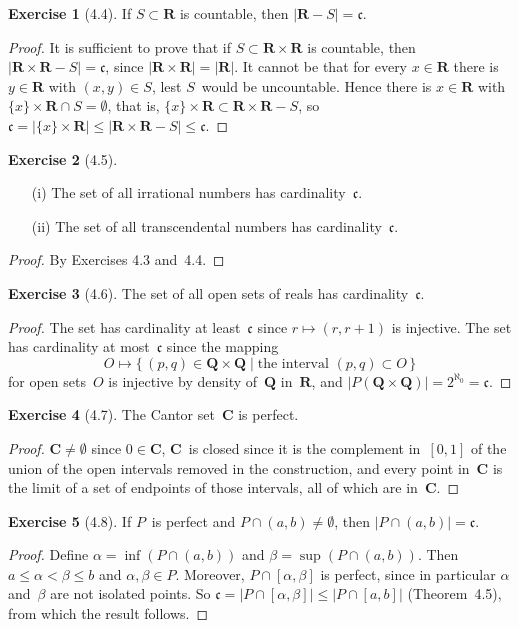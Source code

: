 \documentclass[letterpaper,12pt]{article}
\newcommand{\Q}{\boldsymbol{Q}}
\newcommand{\R}{\boldsymbol{R}}
\newcommand{\C}{\boldsymbol{C}}
\renewcommand{\P}{P}
\newcommand{\cc}{\mathfrak{c}}
\newcommand{\al}{\aleph}
\newcommand{\sect}{\cap}
\newcommand{\card}[1]{|#1|}
\theoremstyle{definition}
\newtheorem*{exer}{Exercise}
\theoremstyle{remark}
\begin{document}
\begin{exer}[4.4]
If \(S\subset\R\) is countable, then \(\card{\R-S}=\cc\).
\end{exer}
\begin{proof}
It is sufficient to prove that if \(S\subset\R\times\R\) is countable, then \(\card{\R\times\R-S}=\cc\), since \(\card{\R\times\R}=\card{\R}\). It cannot be that for every \(x\in\R\) there is \(y\in\R\) with \((x,y)\in S\), lest \(S\)~would be uncountable. Hence there is \(x\in\R\) with \(\{x\}\times\R\sect S=\emptyset\), that is, \(\{x\}\times\R\subset\R\times\R-S\), so \(\cc=\card{\{x\}\times\R}\le\card{\R\times\R-S}\le\cc\).
\end{proof}

\begin{exer}[4.5]\
\begin{enumerate}[itemsep=0pt]
\item[(i)] The set of all irrational numbers has cardinality~\(\cc\).
\item[(ii)] The set of all transcendental numbers has cardinality~\(\cc\).
\end{enumerate}
\end{exer}
\begin{proof}
By Exercises 4.3 and~4.4.
\end{proof}

\begin{exer}[4.6]
The set of all open sets of reals has cardinality~\(\cc\).
\end{exer}
\begin{proof}
The set has cardinality at least~\(\cc\) since \(r\mapsto(r,r+1)\) is injective. The set has cardinality at most~\(\cc\) since the mapping
\[O\mapsto\{\,(p,q)\in\Q\times\Q\mid\text{the interval }(p,q)\subset O\,\}\]
for open sets~\(O\) is injective by density of~\(\Q\) in~\(\R\), and \(\card{\P(\Q\times\Q)}=2^{\al_0}=\cc\).
\end{proof}

\begin{exer}[4.7]
The Cantor set~\(\C\) is perfect.
\end{exer}
\begin{proof}
\(\C\ne\emptyset\) since \(0\in\C\), \(\C\)~is closed since it is the complement in~\([0,1]\) of the union of the open intervals removed in the construction, and every point in~\(\C\) is the limit of a set of endpoints of those intervals, all of which are in~\(\C\).
\end{proof}

\begin{exer}[4.8]
If \(P\)~is perfect and \(P\sect(a,b)\ne\emptyset\), then \(\card{P\sect(a,b)}=\cc\).
\end{exer}
\begin{proof}
Define \(\alpha=\inf(P\sect(a,b))\) and \(\beta=\sup(P\sect(a,b))\). Then \(a\le\alpha<\beta\le b\) and \(\alpha,\beta\in P\). Moreover, \(P\sect[\alpha,\beta]\) is perfect, since in particular \(\alpha\) and~\(\beta\) are not isolated points. So \(\cc=\card{P\sect[\alpha,\beta]}\le\card{P\sect[a,b]}\) (Theorem~4.5), from which the result follows.
\end{proof}
\end{document}
